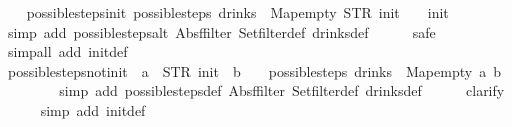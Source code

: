 \begin{isabellebody}
%
\isadelimproof
\ \ %
\endisadelimproof
%
\isatagproof
{}\isamarkupfalse%
%
\endisatagproof
{\isafoldproof}%
%
\isadelimproof
\isanewline
%
\endisadelimproof
\isanewline
{}\isamarkupfalse%
\ possible{\isacharunderscore}steps{\isacharunderscore}init{\isacharcolon}\ {\isachardoublequoteopen}possible{\isacharunderscore}steps\ drinks\ {}\ Map{\isachardot}empty\ STR\ {\isacharprime}{\isacharprime}init{\isacharprime}{\isacharprime}\ {\isacharbrackleft}{\isacharbrackright}\ {\isacharequal}\ {\isacharbraceleft}{\isacharbar}{\isacharparenleft}{}{\isacharcomma}\ init{\isacharparenright}{\isacharbar}{\isacharbraceright}{\isachardoublequoteclose}\isanewline
%
\isadelimproof
\ \ \ \ %
\endisadelimproof
%
\isatagproof
{}\isamarkupfalse%
\ {\isacharparenleft}simp\ add{\isacharcolon}\ possible{\isacharunderscore}steps{\isacharunderscore}alt\ Abs{\isacharunderscore}ffilter\ Set{\isachardot}filter{\isacharunderscore}def\ drinks{\isacharunderscore}def{\isacharparenright}\isanewline
\ \ \ \ \isamarkupfalse%
\ safe\isanewline
\ \ \isamarkupfalse%
\ {\isacharparenleft}simp{\isacharunderscore}all\ add{\isacharcolon}\ init{\isacharunderscore}def{\isacharparenright}%
\endisatagproof
{\isafoldproof}%
%
\isadelimproof
\isanewline
%
\endisadelimproof
\isanewline
{}\isamarkupfalse%
\ possible{\isacharunderscore}steps{\isacharunderscore}not{\isacharunderscore}init{\isacharcolon}\ {\isachardoublequoteopen}{\isasymnot}\ {\isacharparenleft}a\ {\isacharequal}\ STR\ {\isacharprime}{\isacharprime}init{\isacharprime}{\isacharprime}\ {\isasymand}\ b\ {\isacharequal}\ {\isacharbrackleft}{\isacharbrackright}{\isacharparenright}\ {\isasymLongrightarrow}\ possible{\isacharunderscore}steps\ drinks\ {}\ Map{\isachardot}empty\ a\ b\ {\isacharequal}\ {\isacharbraceleft}{\isacharbar}{\isacharbar}{\isacharbraceright}{\isachardoublequoteclose}\isanewline
%
\isadelimproof
\ \ \ \ %
\endisadelimproof
%
\isatagproof
{}\isamarkupfalse%
\ {\isacharparenleft}simp\ add{\isacharcolon}\ possible{\isacharunderscore}steps{\isacharunderscore}def\ Abs{\isacharunderscore}ffilter\ Set{\isachardot}filter{\isacharunderscore}def\ drinks{\isacharunderscore}def{\isacharparenright}\isanewline
\ \ \ \ \isamarkupfalse%
\ clarify\isanewline
\ \ \ \ \isamarkupfalse%
\ {\isacharparenleft}simp\ add{\isacharcolon}\ init{\isacharunderscore}def{\isacharparenright}%
\endisatagproof
{\isafoldproof}%
%
\isadelimproof
\isanewline
%
\endisadelimproof
\isanewline

\end{isabellebody}
